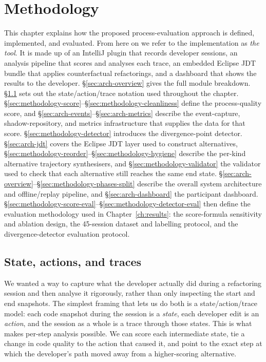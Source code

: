 \chapter{Methodology}
\label{ch:methodology}
\label{ch:architecture}

This chapter explains how the proposed process-evaluation approach is defined, implemented, and evaluated. From here on we refer to the implementation as \emph{the tool}. It is made up of an IntelliJ plugin that records developer sessions, an analysis pipeline that scores and analyses each trace, an embedded Eclipse JDT bundle that applies counterfactual refactorings, and a dashboard that shows the results to the developer. \S\ref{sec:arch-overview} gives the full module breakdown. \S\ref{sec:methodology-notation} sets out the state/action/trace notation used throughout the chapter. \S\ref{sec:methodology-score}--\S\ref{sec:methodology-cleanliness} define the process-quality score, and \S\ref{sec:arch-events}--\S\ref{sec:arch-metrics} describe the event-capture, shadow-repository, and metrics infrastructure that supplies the data for that score. \S\ref{sec:methodology-detector} introduces the divergence-point detector. \S\ref{sec:arch-jdt} covers the Eclipse JDT layer used to construct alternatives, \S\ref{sec:methodology-reorder}--\S\ref{sec:methodology-hygiene} describe the per-kind alternative trajectory synthesisers, and \S\ref{sec:methodology-validator} the validator used to check that each alternative still reaches the same end state. \S\ref{sec:arch-overview}--\S\ref{sec:methodology-phases-split} describe the overall system architecture and offline/replay pipeline, and \S\ref{sec:arch-dashboard} the participant dashboard. \S\ref{sec:methodology-score-eval}--\S\ref{sec:methodology-detector-eval} then define the evaluation methodology used in Chapter~\ref{ch:results}: the score-formula sensitivity and ablation design, the 45-session dataset and labelling protocol, and the divergence-detector evaluation protocol.

\section{State, actions, and traces}
\label{sec:methodology-notation}

We wanted a way to capture what the developer actually did during a refactoring session and then analyse it rigorously, rather than only inspecting the start and end snapshots. The simplest framing that lets us do both is a state/action/trace model: each code snapshot during the session is a \emph{state}, each developer edit is an \emph{action}, and the session as a whole is a trace through those states. This is what makes per-step analysis possible. We can score each intermediate state, tie a change in code quality to the action that caused it, and point to the exact step at which the developer's path moved away from a higher-scoring alternative.

